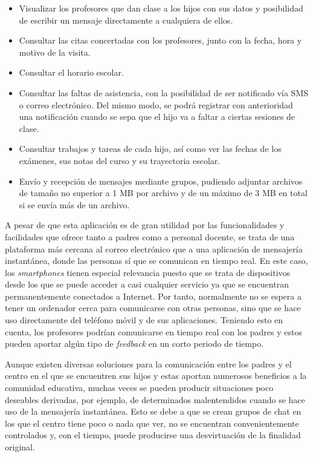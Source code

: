 \begin{itemize}
	\item Visualizar los profesores que dan clase a los hijos con sus datos y posibilidad de escribir un mensaje directamente a cualquiera de ellos.
	\item Consultar las citas concertadas con los profesores, junto con la fecha, hora y motivo de la visita.
	\item Consultar el horario escolar.
	\item Consultar las faltas de asistencia, con la posibilidad de ser notificado vía \acf{SMS} o correo electrónico. Del mismo modo, se podrá registrar con anterioridad una notificación cuando se sepa que el hijo va a faltar a ciertas sesiones de clase.
	\item Consultar trabajos y tareas de cada hijo, así como ver las fechas de los exámenes, sus notas del curso y su trayectoria escolar.
	\item Envío y recepción de mensajes mediante grupos, pudiendo adjuntar archivos de tamaño no superior a 1 \acf{MB} por archivo y de un máximo de 3 \acs{MB} en total si se envía más de un archivo.
\end{itemize}

A pesar de que esta aplicación es de gran utilidad por las funcionalidades y facilidades que ofrece tanto a padres como a personal docente, se trata de una plataforma más cercana al correo electrónico que a una aplicación de mensajería instantánea, donde las personas sí que se comunican en tiempo real. En este caso, los \textit{smartphones} tienen especial relevancia puesto que se trata de dispositivos desde los que se puede acceder a casi cualquier servicio ya que se encuentran permanentemente conectados a Internet. Por tanto, normalmente no se espera a tener un ordenador cerca para comunicarse con otras personas, sino que se hace uso directamente del teléfono móvil y de sus aplicaciones. Teniendo esto en cuenta, los profesores podrían comunicarse en tiempo real con los padres y estos pueden aportar algún tipo de \textit{feedback} en un corto periodo de tiempo.

Aunque existen diversas soluciones para la comunicación entre los padres y el centro en el que se encuentren sus hijos y estas aportan numerosos beneficios a la comunidad educativa, muchas veces se pueden producir situaciones poco deseables derivadas, por ejemplo, de determinados malentendidos cuando se hace uso de la mensajería instantánea. Esto se debe a que se crean grupos de chat en los que el centro tiene poco o nada que ver, no se encuentran convenientemente controlados y, con el tiempo, puede producirse una desvirtuación de la finalidad original.

